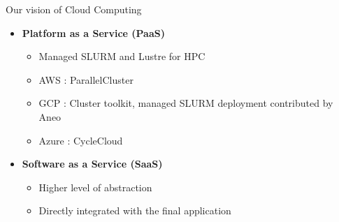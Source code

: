 \documentclass[10pt,aspectratio=1609]{beamer}
\begin{document}
\begin{section}{Our vision of Cloud Computing}
\begin{frame}
\begin{itemize}
    \item \textbf{Platform as a Service (PaaS)}
    \begin{itemize}
      \item Managed SLURM and Lustre for HPC
      \item AWS : ParallelCluster
      \item GCP : Cluster toolkit, managed SLURM deployment contributed by Aneo
      \item Azure : CycleCloud
    \end{itemize}

    \item \textbf{Software as a Service (SaaS)}
    \begin{itemize}
      \item Higher level of abstraction
      \item Directly integrated with the final application
    \end{itemize}
  \end{itemize}
\end{frame}

\end{section}
\end{document}
